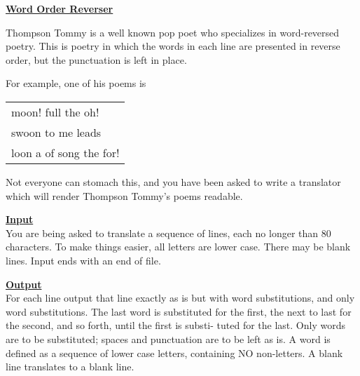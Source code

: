 \documentclass[12pt]{article}
\begin{document}
\newcommand{\problem}[1]{\underline{\Large \bf #1}}
\renewcommand{\section}[1]{\bigskip\underline{\bf #1}\\}
\newcommand{\header}[1]{\underline{\bf #1}}
\setlength{\parindent}{0.0in}
\setlength{\parskip}{1ex}

\problem{Word Order Reverser}

Thompson Tommy is a well known pop poet who specializes
in word-reversed poetry.  This is poetry in which the
words in each line are presented in reverse order, but
the punctuation is left in place.

For example, one of his poems is
\begin{center}\begin{tabular}{l}
moon! full the oh! \\
swoon to me leads \\
loon a of song the for! \\
\end{tabular}\end{center}

Not everyone can stomach this, and you have been asked
to write a translator which will render Thompson Tommy's
poems readable.


\section{Input}
You are being asked to translate a sequence of lines,
each no longer than 80 characters.  To make things
easier, all letters are lower case.  There may be blank
lines.  Input ends with an end of file.


\section{Output}
For each line output that line exactly as is but with
word substitutions, and only word substitutions.  The
last word is substituted for the first, the next to last
for the second, and so forth, until the first is substi-
tuted for the last.  Only words are to be substituted;
spaces and punctuation are to be left as is.  A word is
defined as a sequence of lower case letters, containing
NO non-letters.  A blank line translates to a blank
line.
\end{document}

